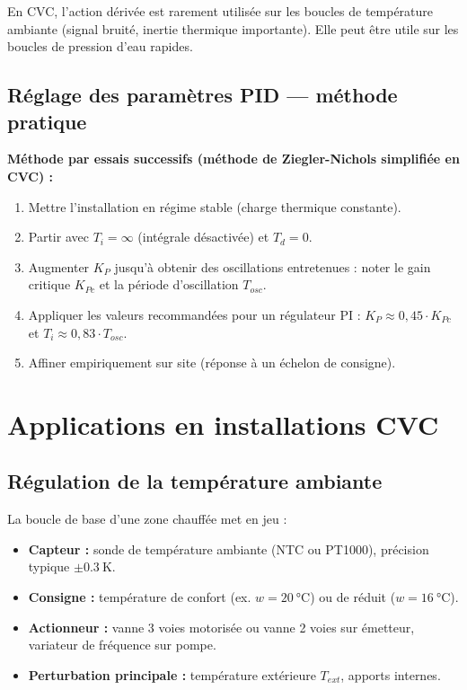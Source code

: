 \vspace{0.5em}
\begin{attention}
  En CVC, l'action dérivée est rarement utilisée sur les boucles de température ambiante (signal bruité, inertie thermique importante). Elle peut être utile sur les boucles de pression d'eau rapides.
\end{attention}

\subsection{Réglage des paramètres PID — méthode pratique}

\begin{methode}
  \textbf{Méthode par essais successifs (méthode de Ziegler-Nichols simplifiée en CVC) :}
  \begin{enumerate}
    \item Mettre l'installation en régime stable (charge thermique constante).
    \item Partir avec $T_i = \infty$ (intégrale désactivée) et $T_d = 0$.
    \item Augmenter $K_P$ jusqu'à obtenir des oscillations entretenues : noter le gain critique $K_{Pc}$ et la période d'oscillation $T_{osc}$.
    \item Appliquer les valeurs recommandées pour un régulateur PI :
      $K_P \approx 0{,}45 \cdot K_{Pc}$ et $T_i \approx 0{,}83 \cdot T_{osc}$.
    \item Affiner empiriquement sur site (réponse à un échelon de consigne).
  \end{enumerate}
\end{methode}

\section{Applications en installations CVC}

\subsection{Régulation de la température ambiante}

La boucle de base d'une zone chauffée met en jeu :
\begin{itemize}
  \item \textbf{Capteur :} sonde de température ambiante (NTC ou PT1000), précision typique $\pm\SI{0.3}{\kelvin}$.
  \item \textbf{Consigne :} température de confort (ex. $w = \SI{20}{\celsius}$) ou de réduit ($w = \SI{16}{\celsius}$).
  \item \textbf{Actionneur :} vanne 3 voies motorisée ou vanne 2 voies sur émetteur, variateur de fréquence sur pompe.
  \item \textbf{Perturbation principale :} température extérieure $T_{ext}$, apports internes.
\end{itemize}

